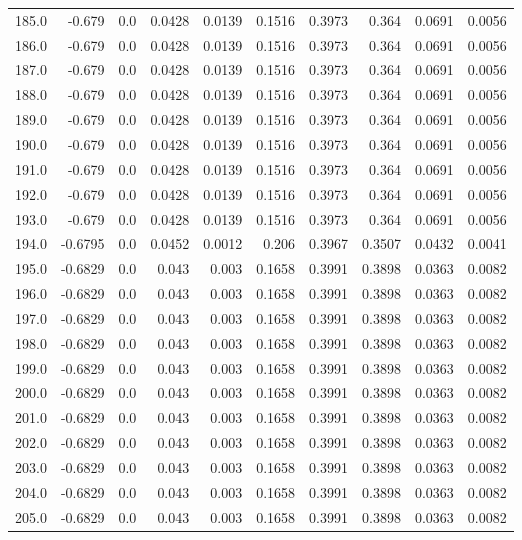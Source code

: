 \begin{longtable}{lrrrrrrrrr}
185.0 & -0.679 & 0.0 & 0.0428 & 0.0139 & 0.1516 & 0.3973 & 0.364 & 0.0691 & 0.0056 \\
186.0 & -0.679 & 0.0 & 0.0428 & 0.0139 & 0.1516 & 0.3973 & 0.364 & 0.0691 & 0.0056 \\
187.0 & -0.679 & 0.0 & 0.0428 & 0.0139 & 0.1516 & 0.3973 & 0.364 & 0.0691 & 0.0056 \\
188.0 & -0.679 & 0.0 & 0.0428 & 0.0139 & 0.1516 & 0.3973 & 0.364 & 0.0691 & 0.0056 \\
189.0 & -0.679 & 0.0 & 0.0428 & 0.0139 & 0.1516 & 0.3973 & 0.364 & 0.0691 & 0.0056 \\
190.0 & -0.679 & 0.0 & 0.0428 & 0.0139 & 0.1516 & 0.3973 & 0.364 & 0.0691 & 0.0056 \\
191.0 & -0.679 & 0.0 & 0.0428 & 0.0139 & 0.1516 & 0.3973 & 0.364 & 0.0691 & 0.0056 \\
192.0 & -0.679 & 0.0 & 0.0428 & 0.0139 & 0.1516 & 0.3973 & 0.364 & 0.0691 & 0.0056 \\
193.0 & -0.679 & 0.0 & 0.0428 & 0.0139 & 0.1516 & 0.3973 & 0.364 & 0.0691 & 0.0056 \\
194.0 & -0.6795 & 0.0 & 0.0452 & 0.0012 & 0.206 & 0.3967 & 0.3507 & 0.0432 & 0.0041 \\
195.0 & -0.6829 & 0.0 & 0.043 & 0.003 & 0.1658 & 0.3991 & 0.3898 & 0.0363 & 0.0082 \\
196.0 & -0.6829 & 0.0 & 0.043 & 0.003 & 0.1658 & 0.3991 & 0.3898 & 0.0363 & 0.0082 \\
197.0 & -0.6829 & 0.0 & 0.043 & 0.003 & 0.1658 & 0.3991 & 0.3898 & 0.0363 & 0.0082 \\
198.0 & -0.6829 & 0.0 & 0.043 & 0.003 & 0.1658 & 0.3991 & 0.3898 & 0.0363 & 0.0082 \\
199.0 & -0.6829 & 0.0 & 0.043 & 0.003 & 0.1658 & 0.3991 & 0.3898 & 0.0363 & 0.0082 \\
200.0 & -0.6829 & 0.0 & 0.043 & 0.003 & 0.1658 & 0.3991 & 0.3898 & 0.0363 & 0.0082 \\
201.0 & -0.6829 & 0.0 & 0.043 & 0.003 & 0.1658 & 0.3991 & 0.3898 & 0.0363 & 0.0082 \\
202.0 & -0.6829 & 0.0 & 0.043 & 0.003 & 0.1658 & 0.3991 & 0.3898 & 0.0363 & 0.0082 \\
203.0 & -0.6829 & 0.0 & 0.043 & 0.003 & 0.1658 & 0.3991 & 0.3898 & 0.0363 & 0.0082 \\
204.0 & -0.6829 & 0.0 & 0.043 & 0.003 & 0.1658 & 0.3991 & 0.3898 & 0.0363 & 0.0082 \\
205.0 & -0.6829 & 0.0 & 0.043 & 0.003 & 0.1658 & 0.3991 & 0.3898 & 0.0363 & 0.0082 \\

\end{longtable}
